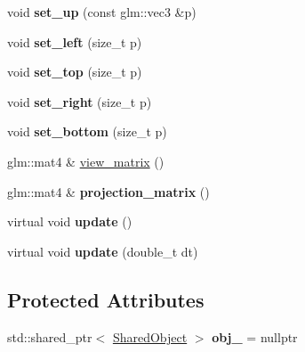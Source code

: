 \begin{DoxyCompactItemize}
\item 
\hypertarget{classs9_1_1Camera_a269cd19842303a20df7b707fd9fffe82}{void {\bfseries set\-\_\-up} (const glm\-::vec3 \&p)}\label{classs9_1_1Camera_a269cd19842303a20df7b707fd9fffe82}

\item 
\hypertarget{classs9_1_1Camera_a059cec22aa650e270b95b322bc5aa9a7}{void {\bfseries set\-\_\-left} (size\-\_\-t p)}\label{classs9_1_1Camera_a059cec22aa650e270b95b322bc5aa9a7}

\item 
\hypertarget{classs9_1_1Camera_a0d40f3e9b239cf6979a34b1df0a9764d}{void {\bfseries set\-\_\-top} (size\-\_\-t p)}\label{classs9_1_1Camera_a0d40f3e9b239cf6979a34b1df0a9764d}

\item 
\hypertarget{classs9_1_1Camera_a2c164ccc92ccca8ea2bb81d8eb779023}{void {\bfseries set\-\_\-right} (size\-\_\-t p)}\label{classs9_1_1Camera_a2c164ccc92ccca8ea2bb81d8eb779023}

\item 
\hypertarget{classs9_1_1Camera_ad1e6a888b424e32632ff4a795e0f2c8d}{void {\bfseries set\-\_\-bottom} (size\-\_\-t p)}\label{classs9_1_1Camera_ad1e6a888b424e32632ff4a795e0f2c8d}

\item 
glm\-::mat4 \& \hyperlink{classs9_1_1Camera_aad4cde7320e0a12e13453bd5f4cef494}{view\-\_\-matrix} ()
\item 
\hypertarget{classs9_1_1Camera_a63a42ee76bb621c387662ca2bc1be690}{glm\-::mat4 \& {\bfseries projection\-\_\-matrix} ()}\label{classs9_1_1Camera_a63a42ee76bb621c387662ca2bc1be690}

\item 
\hypertarget{classs9_1_1Camera_a42cda7239981a5618660d04bd5893556}{virtual void {\bfseries update} ()}\label{classs9_1_1Camera_a42cda7239981a5618660d04bd5893556}

\item 
\hypertarget{classs9_1_1Camera_a4367ec82119e3fe249d744d420875f3d}{virtual void {\bfseries update} (double\-\_\-t dt)}\label{classs9_1_1Camera_a4367ec82119e3fe249d744d420875f3d}

\end{DoxyCompactItemize}
\subsection*{Protected Attributes}
\begin{DoxyCompactItemize}
\item 
\hypertarget{classs9_1_1Camera_a3b90bea9a4aca0c9974b4bc8604abff0}{std\-::shared\-\_\-ptr$<$ \hyperlink{structs9_1_1Camera_1_1SharedObject}{Shared\-Object} $>$ {\bfseries obj\-\_\-} = nullptr}\label{classs9_1_1Camera_a3b90bea9a4aca0c9974b4bc8604abff0}

\end{DoxyCompactItemize}


